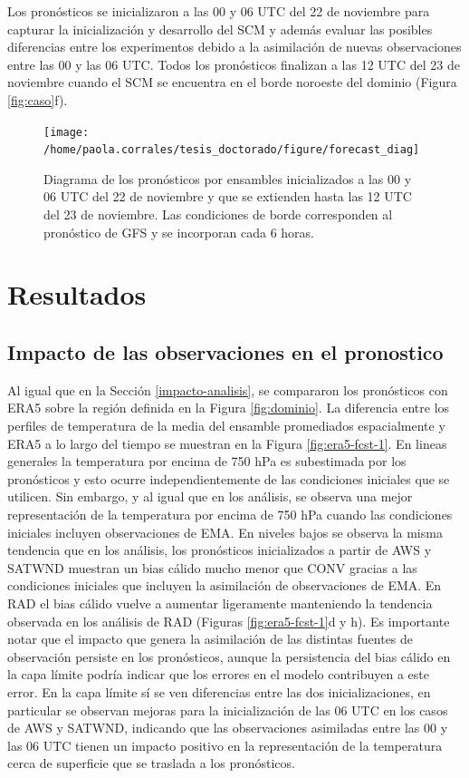 \documentclass[12pt,oneside,a4paper]{reedthesis}
\begin{document}
Los pronósticos se inicializaron a las 00 y 06 UTC del 22 de noviembre para capturar la inicialización y desarrollo del SCM y además evaluar las posibles diferencias entre los experimentos debido a la asimilación de nuevas observaciones entre las 00 y las 06 UTC. Todos los pronósticos finalizan a las 12 UTC del 23 de noviembre cuando el SCM se encuentra en el borde noroeste del dominio (Figura \ref{fig:caso}f).


\begin{figure}
\texttt{[image: /home/paola.corrales/tesis\_doctorado/figure/forecast\_diag]} \caption{Diagrama de los pronósticos por ensambles inicializados a las 00 y 06 UTC del 22 de noviembre y que se extienden hasta las 12 UTC del 23 de noviembre. Las condiciones de borde corresponden al pronóstico de GFS y se incorporan cada 6 horas.}\label{fig:cycle-fcst}
\end{figure}
\hypertarget{resultados-1}{%
\section{Resultados}\label{resultados-1}}

\hypertarget{prono-impacto}{%
\subsection{Impacto de las observaciones en el pronostico}\label{prono-impacto}}

Al igual que en la Sección \ref{impacto-analisis}, se compararon los pronósticos con ERA5 sobre la región definida en la Figura \ref{fig:dominio}. La diferencia entre los perfiles de temperatura de la media del ensamble promediados espacialmente y ERA5 a lo largo del tiempo se muestran en la Figura \ref{fig:era5-fcst-1}. En lineas generales la temperatura por encima de 750 hPa es subestimada por los pronósticos y esto ocurre independientemente de las condiciones iniciales que se utilicen. Sin embargo, y al igual que en los análisis, se observa una mejor representación de la temperatura por encima de 750 hPa cuando las condiciones iniciales incluyen observaciones de EMA. En niveles bajos se observa la misma tendencia que en los análisis, los pronósticos inicializados a partir de AWS y SATWND muestran un bias cálido mucho menor que CONV gracias a las condiciones iniciales que incluyen la asimilación de observaciones de EMA. En RAD el bias cálido vuelve a aumentar ligeramente manteniendo la tendencia observada en los análisis de RAD (Figuras \ref{fig:era5-fcst-1}d y h). Es importante notar que el impacto que genera la asimilación de las distintas fuentes de observación persiste en los pronósticos, aunque la persistencia del bias cálido en la capa límite podría indicar que los errores en el modelo contribuyen a este error. En la capa límite sí se ven diferencias entre las dos inicializaciones, en particular se observan mejoras para la inicialización de las 06 UTC en los casos de AWS y SATWND, indicando que las observaciones asimiladas entre las 00 y las 06 UTC tienen un impacto positivo en la representación de la temperatura cerca de superficie que se traslada a los pronósticos.
\end{document}

